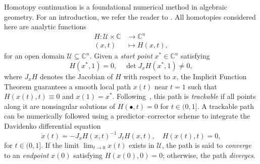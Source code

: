 \documentclass[11pt]{article}
\numberwithin{equation}{section}
\theoremstyle{plain}
\theoremstyle{definition}
\theoremstyle{remark}
\newcommand\bC{{\mathbb C}}
\begin{document}
Homotopy continuation is a foundational numerical method in algebraic geometry. For an introduction, we refer the reader to \cite{BertiniBook,SommeseWamplerBook}. All homotopies considered here are analytic functions
\begin{equation*}
\begin{split}
    H \colon \mathcal{U} \times \bC & \longrightarrow \bC^{n}\\
    (x,t) &\longmapsto H(x,t),
\end{split}
\end{equation*}
for an open domain $\mathcal{U}\subseteq\mathbb{C}^n$. Given a {\em start point} $x^{*}\in \bC^{n}$ satisfying
\begin{equation}\label{davidenko_condition}
    H(x^{*},1) = 0,\quad \det J_{x}H(x^{*},1)\neq 0,
\end{equation}
where $J_{x}H$ denotes the Jacobian of $H$ with respect to $x$, the Implicit Function Theorem guarantees a smooth local path $x(t)$ near $t=1$ such that $H(x(t),t)\equiv 0$ and $x(1) = x^{*}$. Following~\cite{Regeneration}, this path is {\em trackable} if all points along it are nonsingular solutions of $H(\bullet, t) = 0$ for $t\in (0,1]$.
A trackable path can be numerically followed using a predictor--corrector scheme to integrate the Davidenko differential equation
\begin{equation}\label{eq:Davidenko}
\dot{x}(t) = -J_{x}H(x,t)^{-1}\, J_{t}H(x,t), \quad H(x(t),t)=0,
\end{equation}
for $t \in (0,1]$. If the limit $\lim_{t\to 0}x(t)$ exists in $\mathcal{U}$, the path is said to {\em converge} to an {\em endpoint} $x(0)$ satisfying $H(x(0),0) = 0$; otherwise, the path {\em diverges}.
\end{document}
